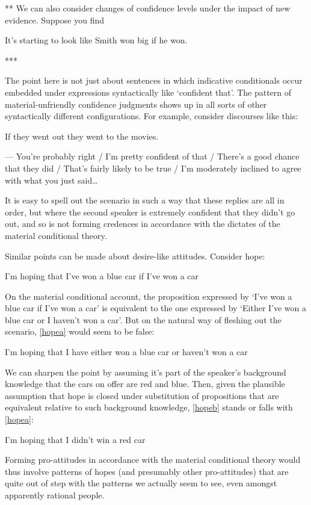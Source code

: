\documentclass[If.tex]{subfiles}
\begin{document}
** We can also consider changes of confidence levels under the impact of new evidence.  Suppose you find 
\begin{prop}
	\nitem
	It's starting to look like Smith won big if he won.  
\end{prop}
*** 

The point here is not just about sentences in which indicative conditionals occur embedded under expressions syntactically like ‘confident that’.  The pattern of material-unfriendly confidence judgments shows up in all sorts of other syntactically different configurations.  For example, consider discourses like this:
\begin{prop}
	\nitem
	If they went out they went to the movies.  
	
	--- You're probably right / I'm pretty confident of that / There's a good chance that they did / That's fairly likely to be true / I'm moderately inclined to agree with what you just said…  
\end{prop}
It is easy to spell out the scenario in such a way that these replies are all in order, but where the second speaker is extremely confident that they didn't go out, and so is not forming credences in accordance with the dictates of the material conditional theory.  

Similar points can be made about desire-like attitudes.  Consider hope:
\begin{prop}
	\nitem \label{hopeblue}
	I'm hoping that I've won a blue car if I've won a car
\end{prop}
On the material conditional account, the proposition expressed by ‘I've won a blue car if I've won a car’ is equivalent to the one expressed by ‘Either I've won a blue car or I haven't won a car’.  But on the natural way of fleshing out the scenario, \ref{hopea} would seem to be false:
\begin{prop}
	\nitem \label{hopea}
	I'm hoping that I have either won a blue car or haven't won a car	
\end{prop}
We can sharpen the point by assuming it's part of the speaker's background knowledge that the cars on offer are red and blue.  Then, given the plausible assumption that hope is closed under substitution of propositions that are equivalent relative to such background knowledge, \ref{hopeb} stands or falls with \ref{hopea}:
\begin{prop}
	\nitem \label{hopeb}
	I'm hoping that I didn't win a red car
\end{prop}
Forming pro-attitudes in accordance with the material conditional theory would thus involve patterns of hopes (and presumably other pro-attitudes) that are quite out of step with the patterns we actually seem to see, even amongst apparently rational people.  
\end{document}
